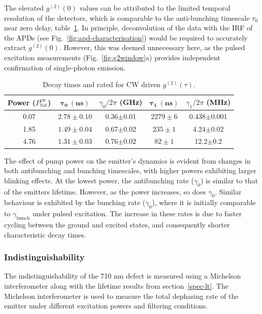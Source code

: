 The elevated $g^{(2)}(0)$ values can be attributed to the limited temporal resolution of the detectors, which is comparable to the anti-bunching timescale $\tau_0$ near zero delay, table~\ref{tab:g2time}. In principle, deconvolution of the data with the IRF of the APDs (see Fig.~\ref{fig:apd-characterisation}) would be required to accurately extract $g^{(2)}(0)$. However, this was deemed unnecessary here, as the pulsed excitation measurements (Fig.~\ref{fig:g2window}a) provides independent confirmation of single-photon emission.

\begin{table}[h!]
\centering
\begin{tabular}{|c|c|c|c|c|}
\hline
\textbf{Power ($P^{\text{cw}}_{\text{Sat}}$)} & $\mathbf{\tau_0 \ (ns)}$ & $\gamma_0/2\pi$ (GHz)& $\mathbf{\tau_1 \ (ns)}$ & $\gamma_1/2\pi$ (MHz) \\
\hline
0.07 &     $2.78\pm0.10$        &  0.36$\pm$0.01  &  $2279\pm6$ & 0.438$\pm$0.001\\
\hline
1.85 &      $1.49\pm0.04$       &   0.67$\pm$0.02  &  $235\pm1$  & 4.24$\pm$0.02\\
\hline
4.76 &      $1.31\pm0.03$       &   0.76$\pm$0.02  &  $82\pm1$   &  12.2$\pm$0.2\\
\hline
\end{tabular}
\caption{Decay times and rated for CW driven $g^{(2)}(\tau)$.}
\label{tab:g2time}
\end{table}

The effect of pump power on the emitter’s dynamics is evident from changes in both antibunching and bunching timescales, with higher powers exhibiting larger blinking effects. At the lowest power, the antibunching rate ($\gamma_0$) is similar to that of the emitters lifetime. However, as the power increases, so does $\gamma_0$. Similar behaviour is exhibited by the bunching rate ($\gamma_0$), where it is initially comparable to $\gamma_{\text{bunch}}$ under pulsed excitation. The increase in these rates is due to faster cycling between the ground and excited states, and consequently shorter characteristic decay times. 

\subsubsection{Indistinguishability}

The indistinguishability of the 710 nm defect is measured using a Michelson interferometer along with the lifetime results from section~\ref{spec-lt}. The Michelson interferometer is used to measure the total dephasing rate of the emitter under different excitation powers and filtering conditions.

